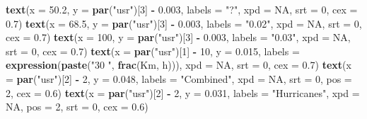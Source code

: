 \documentclass[12pt,twoside]{reedthesis}
\newenvironment{Shaded}{\begin{snugshade}}{\end{snugshade}}
\newcommand{\DataTypeTok}[1]{\textcolor[rgb]{0.13,0.29,0.53}{#1}}
\newcommand{\DecValTok}[1]{\textcolor[rgb]{0.00,0.00,0.81}{#1}}
\newcommand{\FloatTok}[1]{\textcolor[rgb]{0.00,0.00,0.81}{#1}}
\newcommand{\KeywordTok}[1]{\textcolor[rgb]{0.13,0.29,0.53}{\textbf{#1}}}
\newcommand{\NormalTok}[1]{#1}
\newcommand{\OperatorTok}[1]{\textcolor[rgb]{0.81,0.36,0.00}{\textbf{#1}}}
\newcommand{\OtherTok}[1]{\textcolor[rgb]{0.56,0.35,0.01}{#1}}
\newcommand{\StringTok}[1]{\textcolor[rgb]{0.31,0.60,0.02}{#1}}
\begin{document}
\begin{Shaded}
\begin{Highlighting}[]
  \KeywordTok{text}\NormalTok{(}\DataTypeTok{x =} \FloatTok{50.2}\NormalTok{,  }\DataTypeTok{y =} \KeywordTok{par}\NormalTok{(}\StringTok{"usr"}\NormalTok{)[}\DecValTok{3}\NormalTok{] }\OperatorTok{-}\StringTok{ }\FloatTok{0.003}\NormalTok{, }\DataTypeTok{labels =} \StringTok{"?"}\NormalTok{, }\DataTypeTok{xpd =} \OtherTok{NA}\NormalTok{, }\DataTypeTok{srt =} \DecValTok{0}\NormalTok{, }\DataTypeTok{cex =} \FloatTok{0.7}\NormalTok{)}
  \KeywordTok{text}\NormalTok{(}\DataTypeTok{x =} \FloatTok{68.5}\NormalTok{,  }\DataTypeTok{y =} \KeywordTok{par}\NormalTok{(}\StringTok{"usr"}\NormalTok{)[}\DecValTok{3}\NormalTok{] }\OperatorTok{-}\StringTok{ }\FloatTok{0.003}\NormalTok{, }\DataTypeTok{labels =} \StringTok{"0.02"}\NormalTok{, }\DataTypeTok{xpd =} \OtherTok{NA}\NormalTok{, }\DataTypeTok{srt =} \DecValTok{0}\NormalTok{, }\DataTypeTok{cex =} \FloatTok{0.7}\NormalTok{)}
  \KeywordTok{text}\NormalTok{(}\DataTypeTok{x =} \DecValTok{100}\NormalTok{,  }\DataTypeTok{y =} \KeywordTok{par}\NormalTok{(}\StringTok{"usr"}\NormalTok{)[}\DecValTok{3}\NormalTok{] }\OperatorTok{-}\StringTok{ }\FloatTok{0.003}\NormalTok{, }\DataTypeTok{labels =} \StringTok{"0.03"}\NormalTok{, }\DataTypeTok{xpd =} \OtherTok{NA}\NormalTok{, }\DataTypeTok{srt =} \DecValTok{0}\NormalTok{, }\DataTypeTok{cex =} \FloatTok{0.7}\NormalTok{)}
  \KeywordTok{text}\NormalTok{(}\DataTypeTok{x =} \KeywordTok{par}\NormalTok{(}\StringTok{"usr"}\NormalTok{)[}\DecValTok{1}\NormalTok{] }\OperatorTok{-}\StringTok{ }\DecValTok{10}\NormalTok{,  }\DataTypeTok{y =} \FloatTok{0.015}\NormalTok{, }\DataTypeTok{labels =} \KeywordTok{expression}\NormalTok{(}\KeywordTok{paste}\NormalTok{(}\StringTok{"30 "}\NormalTok{, }\KeywordTok{frac}\NormalTok{(Km, h))), }\DataTypeTok{xpd =} \OtherTok{NA}\NormalTok{, }\DataTypeTok{srt =} \DecValTok{0}\NormalTok{, }\DataTypeTok{cex =} \FloatTok{0.7}\NormalTok{)}
  \KeywordTok{text}\NormalTok{(}\DataTypeTok{x =} \KeywordTok{par}\NormalTok{(}\StringTok{"usr"}\NormalTok{)[}\DecValTok{2}\NormalTok{] }\OperatorTok{-}\StringTok{ }\DecValTok{2}\NormalTok{,  }\DataTypeTok{y =} \FloatTok{0.048}\NormalTok{, }\DataTypeTok{labels =} \StringTok{"Combined"}\NormalTok{, }\DataTypeTok{xpd =} \OtherTok{NA}\NormalTok{, }\DataTypeTok{srt =} \DecValTok{0}\NormalTok{, }\DataTypeTok{pos =} \DecValTok{2}\NormalTok{, }\DataTypeTok{cex =} \FloatTok{0.6}\NormalTok{)}
  \KeywordTok{text}\NormalTok{(}\DataTypeTok{x =} \KeywordTok{par}\NormalTok{(}\StringTok{"usr"}\NormalTok{)[}\DecValTok{2}\NormalTok{] }\OperatorTok{-}\StringTok{ }\DecValTok{2}\NormalTok{,  }\DataTypeTok{y =} \FloatTok{0.031}\NormalTok{, }\DataTypeTok{labels =} \StringTok{"Hurricanes"}\NormalTok{, }\DataTypeTok{xpd =} \OtherTok{NA}\NormalTok{, }\DataTypeTok{pos =} \DecValTok{2}\NormalTok{, }\DataTypeTok{srt =} \DecValTok{0}\NormalTok{, }\DataTypeTok{cex =} \FloatTok{0.6}\NormalTok{)}

\end{Highlighting}
\end{Shaded}
\end{document}
